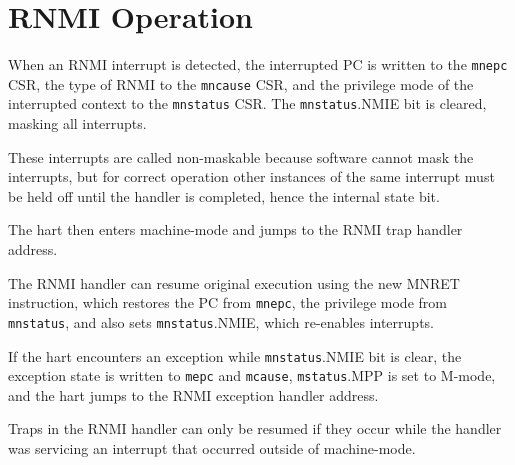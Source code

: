 \section{RNMI Operation}

When an RNMI interrupt is detected, the interrupted PC is written to
the {\tt mnepc} CSR, the type of RNMI to the {\tt mncause} CSR, and the
privilege mode of the interrupted context to the {\tt mnstatus} CSR.
The {\tt mnstatus}.NMIE bit is cleared, masking all interrupts.

\begin{commentary}
These interrupts are called non-maskable because software cannot
mask the interrupts, but for correct operation other instances of the
same interrupt must be held off until the handler is completed, hence
the internal state bit.
\end{commentary}

The hart then enters machine-mode and jumps to the RNMI trap handler
address.

The RNMI handler can resume original execution using the new MNRET
instruction, which restores the PC from {\tt mnepc}, the privilege mode
from {\tt mnstatus}, and also sets {\tt mnstatus}.NMIE, which
re-enables interrupts.

If the hart encounters an exception while {\tt mnstatus}.NMIE bit is clear, the
exception state is written to {\tt mepc} and {\tt mcause}, {\tt mstatus}.MPP is
set to M-mode, and the hart jumps to the RNMI exception handler
address.

\begin{commentary}
Traps in the RNMI handler can only be resumed if they occur while
the handler was servicing an interrupt that occurred outside of
machine-mode.
\end{commentary}
